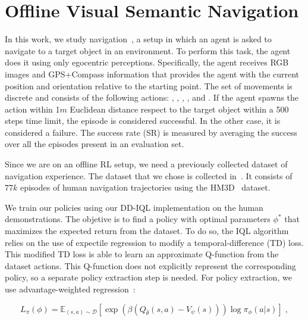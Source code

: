 \section{Offline Visual Semantic Navigation}\label{sec:offline-navigation}

In this work, we study \objnav navigation~\cite{batra2020}, a setup in which an agent is asked to navigate to a target object in an environment.
To perform this task, the agent does it using only egocentric perceptions.
Specifically, the agent receives RGB images and GPS+Compass information that provides the agent with the current position and orientation relative to the starting point.
The set of movements is discrete and consists of the following actions: \turnleft, \turnright, \moveforward, \lookup, \lookdown and \stopac.
If the agent spawns the \stopac action within 1$m$ Euclidean distance respect to the target object within a 500 steps time limit, the episode is considered successful.
In the other case, it is considered a failure.
The success rate (SR) is measured by averaging the success over all the episodes present in an evaluation set.

Since we are on an offline RL setup, we need a previously collected dataset of navigation experience.
The dataset that we chose is collected in~\cite{ramrakhya2023}.
It consists of $77k$ episodes of human navigation trajectories using the HM3D~\cite{Ramakrishnan2021HabitatMatterport3D} dataset.

We train our policies using our DD-IQL implementation on the human demonstrations.
The objetive is to find a policy with optimal parameters $\phi^*$ that maximizes the expected return from the dataset.
To do so, the IQL algorithm relies on the use of expectile regression to modify a temporal-difference (TD) loss.
This modified TD loss is able to learn an approximate Q-function from the dataset actions.
This Q-function does not explicitly represent the corresponding policy, so a separate policy extraction step is needed.
For policy extraction, we use advantage-weighted regression~\cite{peters2007, peng2019advantageweighted}:

\begin{equation}
    L_\pi(\phi)=\mathbb{E}_{(s, a) \sim \mathcal{D}}\left[\exp \left(\beta\left(Q_{\hat{\theta}}(s, a)-V_\psi(s)\right)\right) \log \pi_\phi(a|s)\right]\; ,
    \label{eq:loss}
\end{equation}

